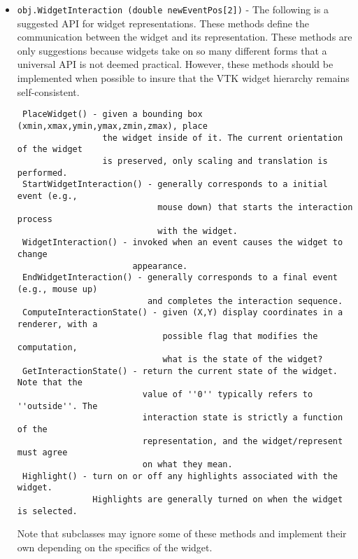 \begin{itemize}
\item  \verb|obj.WidgetInteraction (double newEventPos[2])| -  The following is a suggested API for widget representations. These methods
 define the communication between the widget and its representation. These
 methods are only suggestions because widgets take on so many different
 forms that a universal API is not deemed practical. However, these methods
 should be implemented when possible to insure that the VTK widget hierarchy
 remains self-consistent.
 \begin{verbatim}
 PlaceWidget() - given a bounding box (xmin,xmax,ymin,ymax,zmin,zmax), place 
                 the widget inside of it. The current orientation of the widget 
                 is preserved, only scaling and translation is performed.
 StartWidgetInteraction() - generally corresponds to a initial event (e.g.,
                            mouse down) that starts the interaction process
                            with the widget.
 WidgetInteraction() - invoked when an event causes the widget to change 
                       appearance.
 EndWidgetInteraction() - generally corresponds to a final event (e.g., mouse up)
                          and completes the interaction sequence.
 ComputeInteractionState() - given (X,Y) display coordinates in a renderer, with a
                             possible flag that modifies the computation,
                             what is the state of the widget?
 GetInteractionState() - return the current state of the widget. Note that the
                         value of ''0'' typically refers to ''outside''. The 
                         interaction state is strictly a function of the
                         representation, and the widget/represent must agree
                         on what they mean.
 Highlight() - turn on or off any highlights associated with the widget.
               Highlights are generally turned on when the widget is selected.
 \end{verbatim}
 Note that subclasses may ignore some of these methods and implement their own
 depending on the specifics of the widget.


\end{itemize}
